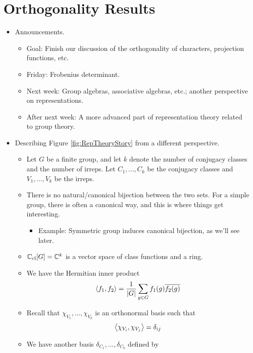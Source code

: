 \documentclass[../notes.tex]{subfiles}
\begin{document}
\section{Orthogonality Results}
\begin{itemize}
    \item {}Announcements.
    \begin{itemize}
        \item Goal: Finish our discussion of the orthogonality of characters, projection functions, etc.
        \item Friday: Frobenius determinant.
        \item Next week: Group algebras, associative algebras, etc.; another perspective on representations.
        \item After next week: A more advanced part of representation theory related to group theory.
    \end{itemize}
    \item Describing Figure \ref{fig:RepTheoryStory} from a different perspective.
    \begin{itemize}
        \item Let $G$ be a finite group, and let $k$ denote the number of conjugacy classes and the number of irreps. Let $C_1,\dots,C_k$ be the conjugacy classes and $V_1,\dots,V_k$ be the irreps.
        \item There is no natural/canonical bijection between the two sets. For a simple group, there is often a canonical way, and this is where things get interesting.
        \begin{itemize}
            \item Example: Symmetric group induces canonical bijection, as we'll see later.
        \end{itemize}
        \item $\mathbb{C}_\text{cl}[G]=\mathbb{C}^k$ is a vector space of class functions and a ring.
        \item We have the Hermitian inner product
        \begin{equation*}
            \left\langle{f_1,f_2}\right\rangle = \frac{1}{|G|}\sum_{g\in G}f_1(g)\overline{f_2(g)}
        \end{equation*}
        \item Recall that $\chi_{V_1},\dots,\chi_{V_k}$ is an orthonormal basis such that
        \begin{equation*}
            \left\langle{\chi_{V_i},\chi_{V_j}}\right\rangle = \delta_{ij}
        \end{equation*}
        \item We have another basis $\delta_{C_1},\dots,\delta_{C_k}$ defined by

\end{itemize}
\end{itemize}
\end{document}
